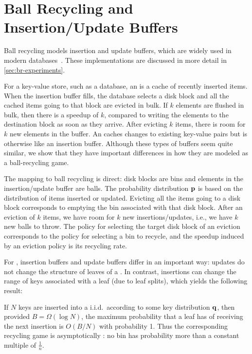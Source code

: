 \section{Ball Recycling and Insertion/Update Buffers}\label{sec:br-motivation}

Ball recycling models insertion and update buffers, which are widely used in
modern databases~\cite{Azure16, IBM17, Xiang12, Informix, Callaghan11, NuDB16,
Oracle17, SAP17, Vertica17,DBLP:conf/vldb/CanimMBLR10,DBLP:journals/pvldb/BenderFJKKMMSSZ12}. These implementations are
discussed in more detail in \cref{sec:br-experiments}.

For a key-value store, such as a database, an  is a
cache of recently inserted items.  When the insertion buffer fills, the
database selects a disk block and all the cached items going to that block are
evicted in bulk.  If $k$ elements are flushed in bulk, then there is a speedup
of $k$, compared to writing the elements to the destination block as soon as
they arrive. After evicting $k$ items, there is room for $k$ new elements in
the buffer.  An  caches changes to existing key-value pairs
but is otherwise like an insertion buffer.  Although these types of buffers
seem quite similar, we show that they have important differences in how they
are modeled as a ball-recycling game.

The mapping to ball recycling is direct: disk blocks are bins and elements in
the insertion/update buffer are balls.  The probability distribution $\mathbf{p}$ is
based on the distribution of items inserted  or updated.  Evicting all the
items going to a disk block corresponds to emptying the bin associated with
that disk block.  After an eviction of $k$ items, we have room for $k$ new
insertions/updates, i.e., we have $k$ new balls to throw.  The policy for
selecting the target disk block of an eviction corresponds to the policy for
selecting a bin to recycle, and the speedup induced by an eviction policy is
its recycling rate.  

For \btrees{}, insertion buffers and update buffers differ in an important way:
updates do not change the structure of leaves of a \btree{}. In contrast,
insertions can change the range of keys associated with a leaf (due to leaf
splits), which yields the following result:

\begin{lemma}\label{lem:uniform-leaves}
	If $N$ keys are inserted into a \btree{} i.i.d.\ according to some key
	distribution $\mathbf{q}$, then provided $B = \Omega(\log{N})$, the maximum
	probability that a leaf has of receiving the next insertion is $O(B/N)$
	with probability 1.  Thus the corresponding recycling game is
	asymptotically : no bin has probability more than a
	constant multiple of $\frac{1}{n}$.
\end{lemma}

